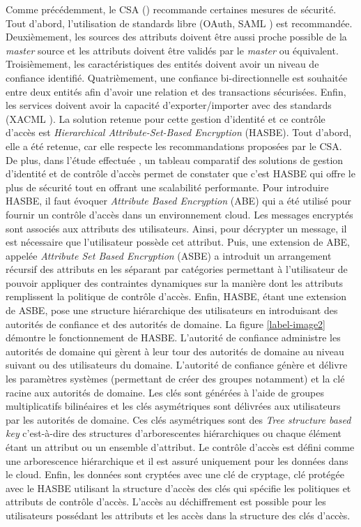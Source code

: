 Comme précédemment, le CSA (\cite{security_guidelines}) recommande certaines mesures de sécurité. Tout d'abord, l'utilisation de standards libre (OAuth, SAML \cite{security_guidelines}) est recommandée. Deuxièmement, les sources des attributs doivent être aussi proche possible de la \textit{master} source et les attributs doivent être validés par le \textit{master} ou équivalent. Troisièmement, les caractéristiques des entités doivent avoir un niveau de confiance identifié. Quatrièmement, une confiance bi-directionnelle est souhaitée entre deux entités afin d'avoir une relation et des transactions sécurisées. Enfin, les services doivent avoir la capacité d'exporter/importer avec des standards (\gls{XACML} \cite{xacml} \cite{security_guidelines}). 
\newline
La solution retenue pour cette gestion d'identité et ce contrôle d'accès est \textit{Hierarchical Attribute-Set-Based Encryption} (HASBE)\cite{hasbe}. Tout d'abord, elle a été retenue, car elle respecte les recommandations proposées par le CSA. De plus, dans l'étude effectuée \cite{security_cloud_survey}, un tableau comparatif des solutions de gestion d'identité et de contrôle d'accès permet de constater que c'est HASBE qui offre le plus de sécurité tout en offrant une scalabilité performante.
\newline
Pour introduire HASBE, il faut évoquer \textit{Attribute Based Encryption} (ABE) \cite{asb} qui a été utilisé pour fournir un contrôle d'accès dans un environnement cloud. Les messages encryptés sont associés aux attributs des utilisateurs. Ainsi, pour décrypter un message, il est nécessaire que l'utilisateur possède cet attribut. Puis, une extension de ABE, appelée \textit{Attribute Set Based Encryption} (ASBE) \cite{asbe} a introduit un arrangement récursif des attributs en les séparant par catégories permettant à l'utilisateur de pouvoir appliquer des contraintes dynamiques sur la manière dont les attributs remplissent la politique de contrôle d'accès. Enfin, HASBE, étant une extension de ASBE, pose une structure hiérarchique des utilisateurs en introduisant des autorités de confiance et des autorités de domaine. La figure \ref{label-image2} démontre le fonctionnement de HASBE. L'autorité de confiance administre les autorités de domaine qui gèrent à leur tour des autorités de domaine au niveau suivant ou des utilisateurs du domaine. L'autorité de confiance génère et délivre les paramètres systèmes (permettant de créer des groupes notamment) et la clé racine aux autorités de domaine. Les clés sont générées à l'aide de groupes multiplicatifs bilinéaires et les clés asymétriques sont délivrées aux utilisateurs par les autorités de domaine. Ces clés asymétriques sont des \textit{Tree structure based key} c'est-à-dire des structures d'arborescentes hiérarchiques ou chaque élément étant un attribut ou un ensemble d'attribut. Le contrôle d'accès est défini comme une arborescence hiérarchique et il est assuré uniquement pour les données dans le cloud. Enfin, les données sont cryptées avec une clé de cryptage, clé protégée avec le HASBE utilisant la structure d'accès des clés qui spécifie les politiques et attributs de contrôle d'accès. L'accès au déchiffrement est possible pour les utilisateurs possédant les attributs et les accès dans la structure des clés d'accès.
